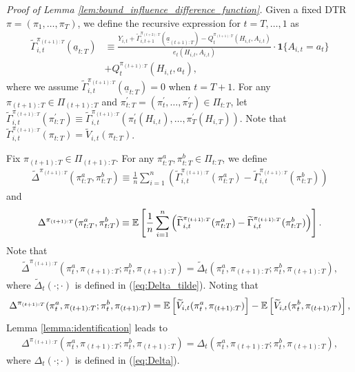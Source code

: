\bigskip

\noindent
\textit{Proof of  Lemma \ref{lem:bound_influence_difference_function}.}
Given a fixed DTR $\pi=(\pi_1,\ldots,\pi_T)$, we define the recursive expression for $t=T,\ldots,1$ as
\begin{align*}
\widetilde{\Gamma}_{i,t}^{\pi_{(t+1):T}}(\underline{a}_{t:T}) &\equiv \frac{Y_{i,t} + \widetilde{\Gamma}_{i,t+1}^{\pi_{(t+2):T}}(\underline{a}_{(t+1):T}) - Q_{t}^{\pi_{(t+1):T}}(H_{i,t},A_{i,t}) }{e_{t}(H_{i,t},A_{i,t})}\cdot \mathbf{1}\{A_{i,t}=a_{t}\} \\
&+ Q_{t}^{\pi_{(t+1):T}}(H_{i,t},a_{t}),
\end{align*}
where we assume $\widetilde{\Gamma}_{i,t}^{\pi_{(t+1):T}}(\underline{a}_{t:T}) = 0$ when $t=T+1$.
For any ${\pi}_{(t+1):T} \in \Pi_{(t+1):T}$ and ${\pi}_{t:T}^{\prime} = (\pi_{t}^{\prime},\ldots,\pi_{T}^{\prime}) \in \Pi_{t:T}$, let $\widetilde{\Gamma}_{i,t}^{{\pi}_{(t+1):T}}(\pi_{t:T}^{\prime}) \equiv \widetilde{\Gamma}_{i,t}^{{\pi}_{(t+1):T}}(\pi_{t}^{\prime}(H_{i,t}),\ldots,\pi_{T}^{\prime}(H_{i,T}))$.
Note that $\widetilde{\Gamma}_{i,t}^{{\pi}_{(t+1):T}}(\pi_{t:T}) = \widetilde{V}_{i,t}(\pi_{t:T})$. 

Fix $\pi_{(t+1):T} \in \Pi_{(t+1):T}$. For any $\pi_{t:T}^{a}, \pi_{t:T}^{b} \in \Pi_{t:T}$, we define 
\begin{align*}
    \widetilde{\Delta}^{\pi_{(t+1):T}} (\pi_{t:T}^{a},\pi_{t:T}^{b}) \equiv \frac{1}{n}\sum_{i=1}^{n}\left(\widetilde{\Gamma}_{i,t}^{\pi_{(t+1):T}}(\pi_{t:T}^{a}) - \widetilde{\Gamma}_{i,t}^{\pi_{(t+1):T}}(\pi_{t:T}^{b})\right)
\end{align*}
and
\begin{align*}
    \Delta^{\pi_{(t+1):T}} (\pi_{t:T}^{a},\pi_{t:T}^{b}) \equiv \mathbb{E}\left[\frac{1}{n}\sum_{i=1}^{n}\left(\widetilde{\Gamma}_{i,t}^{\pi_{(t+1):T}}(\pi_{t:T}^{a}) - \widetilde{\Gamma}_{i,t}^{\pi_{(t+1):T}}(\pi_{t:T}^{b})\right)\right].
\end{align*}
Note that 
\begin{align*}
\widetilde{\Delta}^{\pi_{(t+1):T}}(\pi_{t}^{a},\pi_{(t+1):T};\pi_{t}^{b},\pi_{(t+1):T})
    = \widetilde{\Delta}_{t}(\pi_{t}^{a},\pi_{(t+1):T};\pi_{t}^{b},\pi_{(t+1):T}),
\end{align*}
where $\widetilde{\Delta}_{t}(\cdot;\cdot)$ is defined in (\ref{eq:Delta_tilde}). Noting that 
\begin{align*}
    \Delta^{\pi_{(t+1):T}}(\pi_{t}^{a},\pi_{(t+1):T};\pi_{t}^{b},\pi_{(t+1):T}) = \mathbb{E}\left[\widetilde{V}_{i,t}(\pi_{t}^{a},\pi_{(t+1):T})\right] - \mathbb{E}\left[\widetilde{V}_{i,t}(\pi_{t}^{b},\pi_{(t+1):T})\right],
\end{align*}
Lemma \ref{lemma:identification} leads to
\begin{align*}
    \Delta^{\pi_{(t+1):T}}(\pi_{t}^{a},\pi_{(t+1):T};\pi_{t}^{b},\pi_{(t+1):T}) = \Delta_{t}(\pi_{t}^{a},\pi_{(t+1):T};\pi_{t}^{b},\pi_{(t+1):T}),
\end{align*}
where $\Delta_{t}(\cdot;\cdot)$ is defined in (\ref{eq:Delta}). 

